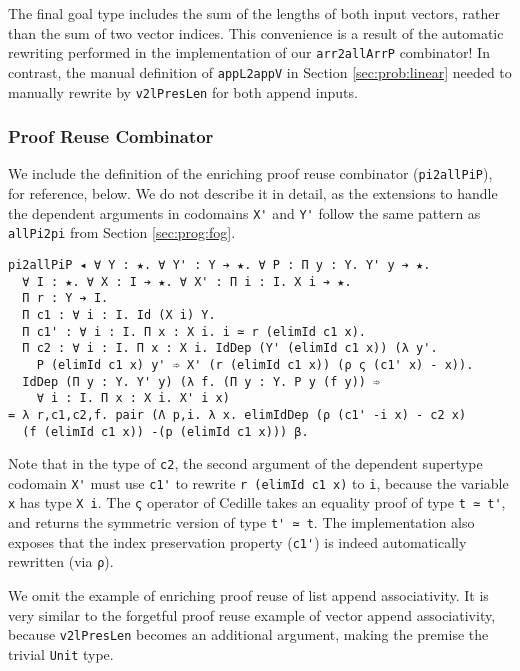 \documentclass[acmsmall,screen]{acmart}
\newcommand{\refsec}[1]{Section \ref{sec:#1}}
\begin{document}
The final goal type includes the sum of the lengths of both input
vectors, rather than the sum of two vector indices.
This convenience is a result
of the automatic rewriting performed in the implementation of our
\verb;arr2allArrP; combinator! In contrast, the manual definition of
\verb;appL2appV; in \refsec{prob:linear} needed to manually rewrite
by \verb;v2lPresLen; for both append inputs.

\subsubsection{Proof Reuse Combinator}

We include the definition of the enriching proof reuse combinator
(\verb;pi2allPiP;), for reference, below.  We do not describe it in
detail, as the extensions to handle the dependent arguments in
codomains \verb;X'; and \verb;Y'; follow the same pattern as
\verb;allPi2pi; from \refsec{prog:fog}.
\begin{verbatim}
pi2allPiP ◂ ∀ Y : ★. ∀ Y' : Y ➔ ★. ∀ P : Π y : Y. Y' y ➔ ★.
  ∀ I : ★. ∀ X : I ➔ ★. ∀ X' : Π i : I. X i ➔ ★.
  Π r : Y ➔ I.
  Π c1 : ∀ i : I. Id (X i) Y.
  Π c1' : ∀ i : I. Π x : X i. i ≃ r (elimId c1 x).
  Π c2 : ∀ i : I. Π x : X i. IdDep (Y' (elimId c1 x)) (λ y'.
    P (elimId c1 x) y' ➾ X' (r (elimId c1 x)) (ρ ς (c1' x) - x)).
  IdDep (Π y : Y. Y' y) (λ f. (Π y : Y. P y (f y)) ➾
    ∀ i : I. Π x : X i. X' i x)
= λ r,c1,c2,f. pair (Λ p,i. λ x. elimIdDep (ρ (c1' -i x) - c2 x)
  (f (elimId c1 x)) -(p (elimId c1 x))) β.
\end{verbatim}
Note that in the type of \verb;c2;, the second argument of the
dependent supertype codomain \verb;X'; must use \verb;c1'; to rewrite
\verb;r (elimId c1 x); to \verb;i;, because the variable \verb;x; has
type \verb;X i;. The \verb;ς; operator of Cedille takes an equality
proof of type \verb;t ≃ t';, and returns the symmetric version of type
\verb;t' ≃ t;. The implementation also exposes that the index preservation
property (\verb;c1';) is indeed automatically rewritten
(via \verb;ρ;).

We omit the example of enriching proof reuse of list append
associativity. It is very similar to the forgetful proof reuse example
of vector append associativity, because \verb;v2lPresLen; becomes an
additional argument, making the premise the trivial \verb;Unit; type.
\end{document}
